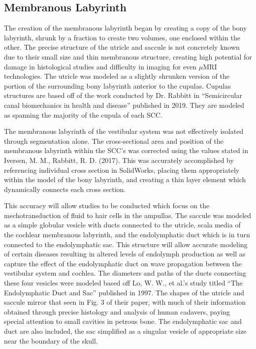 \documentclass[12pt]{article}
\begin{document}
\subsection{Membranous Labyrinth}
The creation of the membranous labyrinth began by creating a copy of the bony labyrinth, shrunk by a fraction to create two volumes, one enclosed within the other. The precise structure of the utricle and saccule is not concretely known due to their small size and thin membranous structure, creating high potential for damage in histological studies and difficulty in imaging for even $\mu$MRI technologies. The utricle was modeled as a slightly shrunken version of the portion of the surrounding bony labyrinth anterior to the cupulas. Cupulas structures are based off of the work conducted by Dr. Rabbitt in “Semicircular canal biomechanics in health and disease” published in 2019. \cite{rabbitt} They are modeled as spanning the majority of the cupula of each SCC.

The membranous labyrinth of the vestibular system was not effectively isolated through segmentation alone. The cross-sectional area and position of the membranous labyrinth within the SCC’s was corrected using the values stated in Iversen, M. M., Rabbitt, R. D. (2017). \cite{iversen} This was accurately accomplished by referencing individual cross section in SolidWorks, placing them appropriately within the model of the bony labyrinth, and creating a thin layer element which dynamically connects each cross section.

This accuracy will allow studies to be conducted which focus on the mechotransduction of fluid to hair cells in the ampullas. The saccule was modeled as a simple globular vesicle with ducts connected to the utricle, scala media of the cochlear membranous labyrinth, and the endolymphatic duct which is in turn connected to the endolymphatic sac. This structure will allow accurate modeling of certain diseases resulting in altered levels of endolymph production as well as capture the effect of the endolymphatic duct on wave propagation between the vestibular system and cochlea.  The diameters and paths of the ducts connecting these four vesicles were modeled based off Lo, W. W., et al.’s study titled “The Endolymphatic Duct and Sac” published in 1997. The shapes of the utricle and saccule mirror that seen in Fig. 3 of their paper, with much of their information obtained through precise histology and analysis of human cadavers, paying special attention to small cavities in petrous bone. The endolymphatic sac and duct are also included, the sac simplified as a singular vesicle of appropriate size near the boundary of the skull.\\
\vspace{0.5pt}
\end{document}
